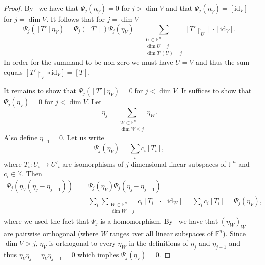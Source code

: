 \documentclass[12pt, reqno]{amsart}
\theoremstyle{definition}
\newcommand{\coefficientsField}{\mathbb{K}}
\newcommand{\idmap}{\mathrm{id}}
\newcommand{\finiteField}{\mathbb{F}}
\begin{document}
	\begin{proof}
		By~\cite[Theorem 4.2]{HarmanSnowdenZelingher2025} we have that $\Psi_j\left(\eta_V\right) = 0$ for $j > \dim V$ and that $\Psi_j\left(\eta_V\right) = \left[\idmap_V\right]$ for $j = \dim V$. It follows that for $j = \dim V$
		\begin{displaymath}
		\Psi_j\left(\left[T'\right]\eta_V\right)= \Psi_j\left(\left[T'\right]\right) \Psi_j\left(\eta_V\right) = \sum_{\substack{U \subset \finiteField^n \\
		\dim U = j\\
		\dim T'\left(U\right) = j}} \left[T' \restriction_U \right] \cdot \left[\idmap_{V}\right].
		\end{displaymath}
	In order for the summand to be non-zero we must have $U = V$ and thus the sum equals $\left[T' \restriction_V \circ \idmap_V\right] = \left[T\right]$.
	
	It remains to show that $\Psi_j\left(\left[T'\right]\eta_V\right) = 0$ for $j < \dim V$. It suffices to show that $\Psi_j\left(\eta_V\right) = 0$ for $j < \dim V$. Let
	\begin{displaymath}
	\eta_j = \sum_{\substack{W \subset \finiteField^n\\
			\dim W \le j}} \eta_W.
			\end{displaymath}
	Also define $\eta_{-1} = 0$.
	Let us write
	\begin{displaymath}
	\Psi_j\left(\eta_V\right) = \sum_i c_i \left[T_i\right],
	\end{displaymath}
	where $T_i \colon U_i \to U'_i$ are isomorphisms of $j$-dimensional linear subspaces of $\finiteField^n$ and $c_i \in \coefficientsField$. Then
	\begin{equation*}
		\begin{split}
			\Psi_j\left(\eta_V \left(\eta_j - \eta_{j-1}\right)\right) &= \Psi_j\left(\eta_V\right)\Psi_j\left(\eta_j-\eta_{j-1}\right) \\
			&= \sum_i \sum_{\substack{W \subset \finiteField^n\\
					\dim W = j}} c_i \left[T_i\right] \cdot \left[\idmap_W\right]  = \sum_i c_i \left[T_i\right] = \Psi_j\left(\eta_V\right),
		\end{split}
	\end{equation*}
	where we used the fact that $\Psi_j$ is a homomorphism. By~\cite[Proposition 4.9]{HarmanSnowdenZelingher2025} we have that $\left(\eta_W\right)_W$ are pairwise orthogonal (where $W$ ranges over all linear subspaces of $\finiteField^n$). Since $\dim V > j$, $\eta_V$ is orthogonal to every $\eta_W$ in the definitions of $\eta_j$ and $\eta_{j-1}$ and thus $\eta_V \eta_j = \eta_V \eta_{j-1} = 0$ which implies $\Psi_j\left(\eta_V\right) = 0$.
	\end{proof}
	
\end{document}
